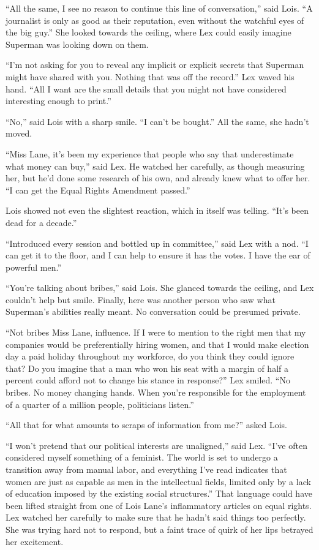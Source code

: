 ``All the same, I see no reason to continue this line of conversation,''
said Lois. ``A journalist is only as good as their reputation, even
without the watchful eyes of the big guy.'' She looked towards the
ceiling, where Lex could easily imagine Superman was looking down on
them.

``I'm not asking for you to reveal any implicit or explicit secrets that
Superman might have shared with you. Nothing that was off the record.''
Lex waved his hand. ``All I want are the small details that you might
not have considered interesting enough to print.''

``No,'' said Lois with a sharp smile. ``I can't be bought.'' All the
same, she hadn't moved.

``Miss Lane, it's been my experience that people who say that
underestimate what money can buy,'' said Lex. He watched her carefully,
as though measuring her, but he'd done some research of his own, and
already knew what to offer her. ``I can get the Equal Rights Amendment
passed.''

Lois showed not even the slightest reaction, which in itself was
telling. ``It's been dead for a decade.''

``Introduced every session and bottled up in committee,'' said Lex with
a nod. ``I can get it to the floor, and I can help to ensure it has the
votes. I have the ear of powerful men.''

``You're talking about bribes,'' said Lois. She glanced towards the
ceiling, and Lex couldn't help but smile. Finally, here was another
person who saw what Superman's abilities really meant. No conversation
could be presumed private.

``Not bribes Miss Lane, influence. If I were to mention to the right men
that my companies would be preferentially hiring women, and that I would
make election day a paid holiday throughout my workforce, do you think
they could ignore that? Do you imagine that a man who won his seat with
a margin of half a percent could afford not to change his stance in
response?'' Lex smiled. ``No bribes. No money changing hands. When
you're responsible for the employment of a quarter of a million people,
politicians listen.''

``All that for what amounts to scraps of information from me?'' asked
Lois.

``I won't pretend that our political interests are unaligned,'' said
Lex. ``I've often considered myself something of a feminist. The world
is set to undergo a transition away from manual labor, and everything
I've read indicates that women are just as capable as men in the
intellectual fields, limited only by a lack of education imposed by the
existing social structures.'' That language could have been lifted
straight from one of Lois Lane's inflammatory articles on equal rights.
Lex watched her carefully to make sure that he hadn't said things too
perfectly. She was trying hard not to respond, but a faint trace of
quirk of her lips betrayed her excitement.

